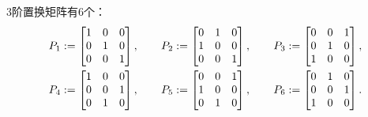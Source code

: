 \begin{example}
3阶置换矩阵有6个：\begin{gather*}
	P_1 := \begin{bmatrix}
		1 & 0 & 0 \\
		0 & 1 & 0 \\
		0 & 0 & 1
	\end{bmatrix},
	\qquad
	P_2 := \begin{bmatrix}
		0 & 1 & 0 \\
		1 & 0 & 0 \\
		0 & 0 & 1
	\end{bmatrix},
	\qquad
	P_3 := \begin{bmatrix}
		0 & 0 & 1 \\
		0 & 1 & 0 \\
		1 & 0 & 0
	\end{bmatrix},
	\\
	P_4 := \begin{bmatrix}
		1 & 0 & 0 \\
		0 & 0 & 1 \\
		0 & 1 & 0
	\end{bmatrix},
	\qquad
	P_5 := \begin{bmatrix}
		0 & 0 & 1 \\
		1 & 0 & 0 \\
		0 & 1 & 0
	\end{bmatrix},
	\qquad
	P_6 := \begin{bmatrix}
		0 & 1 & 0 \\
		0 & 0 & 1 \\
		1 & 0 & 0
	\end{bmatrix}.
\end{gather*}

\end{example}
